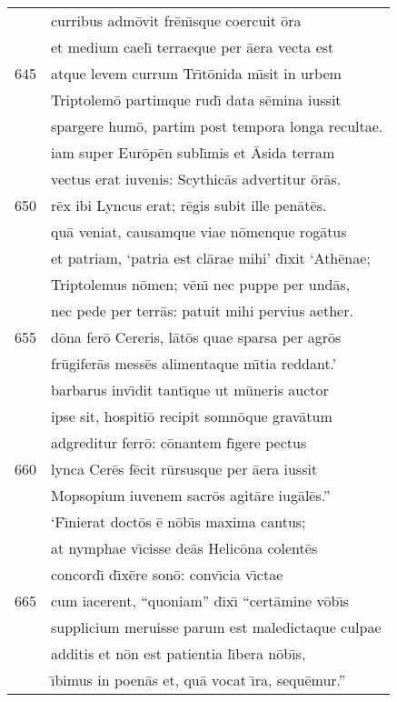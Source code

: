 \documentclass[paper=6in:9in,pagesize=pdftex,
               headinclude=on,footinclude=on,12pt]{scrbook}
\begin{document}
\begin{longtable}[p]{ r l }
 & curribus adm\=ovit fr\=en\={\i}sque coercuit \=ora\\ 
 & et medium cael\={\i} terraeque per \=aera vecta est\\ 
645 & atque levem currum Tr\={\i}t\=onida m\={\i}sit in urbem\\ 
 & Triptolem\=o partimque rud\={\i} data s\=emina iussit\\ 
 & spargere hum\=o, partim post tempora longa recultae.\\ 
 & iam super Eur\=op\=en subl\={\i}mis et \=Asida terram\\ 
 & vectus erat iuvenis: Scythic\=as advertitur \=or\=as.\\ 
650 & r\=ex ibi Lyncus erat; r\=egis subit ille pen\=at\=es.\\ 
 & qu\=a veniat, causamque viae n\=omenque rog\=atus\\ 
 & et patriam, `patria est cl\=arae mihi' d\={\i}xit `Ath\=enae;\\ 
 & Triptolemus n\=omen; v\=en\={\i} nec puppe per und\=as,\\ 
 & nec pede per terr\=as: patuit mihi pervius aether.\\ 
655 & d\=ona fer\=o Cereris, l\=at\=os quae sparsa per agr\=os\\ 
 & fr\=ugifer\=as mess\=es alimentaque m\={\i}tia reddant.'\\ 
 & barbarus inv\={\i}dit tant\={\i}que ut m\=uneris auctor\\ 
 & ipse sit, hospiti\=o recipit somn\=oque grav\=atum\\ 
 & adgreditur ferr\=o: c\=onantem f\={\i}gere pectus\\ 
660 & lynca Cer\=es f\=ecit r\=ursusque per \=aera iussit\\ 
 & Mopsopium iuvenem sacr\=os agit\=are iug\=al\=es.''\\ 
 & \indent `F\={\i}nierat doct\=os \=e n\=ob\={\i}s maxima cantus;\\ 
 & at nymphae v\={\i}cisse de\=as Helic\=ona colent\=es\\ 
 & concord\={\i} d\={\i}x\=ere son\=o: conv\={\i}cia v\={\i}ctae\\ 
665 & cum iacerent, ``quoniam'' d\={\i}x\={\i} ``cert\=amine v\=ob\={\i}s\\ 
 & supplicium meruisse parum est maledictaque culpae\\ 
 & additis et n\=on est patientia l\={\i}bera n\=ob\={\i}s,\\ 
 & \={\i}bimus in poen\=as et, qu\=a vocat \={\i}ra, sequ\=emur.''\\ 

\end{longtable}
\end{document}
